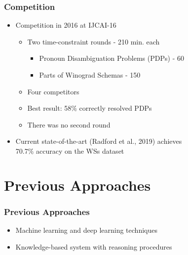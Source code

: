 \documentclass[c,8pt,xcolor...,x11names]{beamer}
\begin{document}
\begin{frame}
\frametitle{Competition}
	\begin{itemize}
	\normalsize
	\item Competition in 2016 at IJCAI-16
	\begin{itemize}
		\normalsize
		\item Two time-constraint rounds - 210 min. each
		\begin{itemize}
			\normalsize
			\item Pronoun Disambiguation Problems (PDPs) - 60
			\item Parts of Winograd Schemas - 150
		\end{itemize}
		\item Four competitors
		\item Best result: 58\% correctly resolved PDPs
		\item There was no second round
		
	\end{itemize}
	
	\item Current \alert{state-of-the-art} (Radford et al., 2019) achieves \\ 70.7\% accuracy on the WSs dataset
\end{itemize}
\end{frame}

\section{Previous Approaches}

\begin{frame}
\frametitle{Previous Approaches}
\begin{itemize}
	\item Machine learning and deep learning techniques
	\item Knowledge-based system with reasoning procedures
\end{itemize}


\end{frame}
\end{document}
